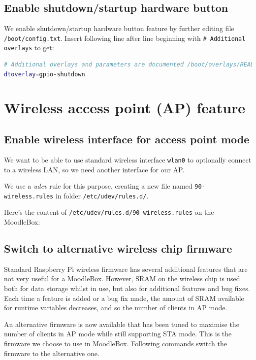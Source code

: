 \documentclass[12pt]{article}
\begin{document}
\subsection{Enable shutdown/startup hardware button}

We enable shutdown/startup hardware button feature by further editing file \lstinline{/boot/config.txt}.
Insert following line after line beginning with \lstinline{# Additional overlays} to get:
\begin{lstlisting}[language=bash]
# Additional overlays and parameters are documented /boot/overlays/README
dtoverlay=gpio-shutdown
\end{lstlisting}

\section{Wireless access point (AP) feature}

\subsection{Enable wireless interface for access point mode}

We want to be able to use standard wireless interface \lstinline{wlan0} to optionally connect to a wireless LAN, so we need another interface for our AP.

We use a \textsl{udev} rule for this purpose, creating a new file named \lstinline{90-wireless.rules} in folder \lstinline{/etc/udev/rules.d/}.

Here's the content of \lstinline{/etc/udev/rules.d/90-wireless.rules} on the MoodleBox:


\subsection{Switch to alternative wireless chip firmware}

Standard Raspberry Pi wireless firmware has several additional features that are not very useful for a MoodleBox.
However, SRAM on the wireless chip is used both for data storage whilst in use, but also for additional features and bug fixes.
Each time a feature is added or a bug fix made, the amount of SRAM available for runtime variables decreases, and so the number of clients in AP mode.

An alternative firmware is now available that has been tuned to maximise the number of clients in AP mode while still supporting STA mode.
This is the firmware we choose to use in MoodleBox.
Following commands switch the firmware to the alternative one.
\end{document}
